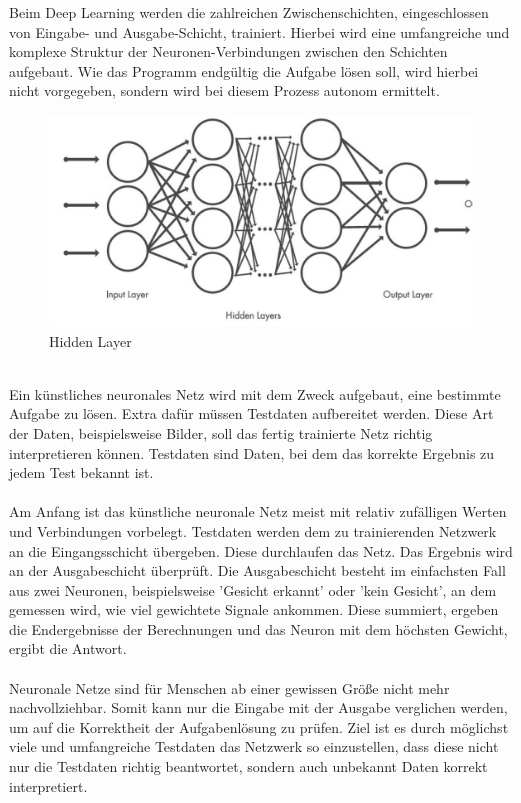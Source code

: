 \documentclass[12pt,oneside,a4paper,parskip]{scrbook}
\begin{document}
Beim Deep Learning werden die zahlreichen Zwischenschichten, eingeschlossen von Eingabe- und Ausgabe-Schicht, trainiert. Hierbei wird eine umfangreiche und komplexe Struktur der Neuronen-Verbindungen zwischen den Schichten aufgebaut. Wie das Programm endgültig die Aufgabe lösen soll, wird hierbei nicht vorgegeben, sondern wird bei diesem Prozess autonom ermittelt.
\begin{figure}[h]
	\begin{center}
		\includegraphics[width=15cm]{Bilder/Deep-Learning.jpg}
		\caption{Hidden Layer}
		\label{fig:DL}
	\end{center}
\end{figure}
\\Ein künstliches neuronales Netz wird mit dem Zweck aufgebaut, eine bestimmte Aufgabe zu lösen. Extra dafür müssen Testdaten aufbereitet werden. Diese Art der Daten, beispielsweise Bilder, soll das fertig trainierte Netz richtig interpretieren können. Testdaten sind Daten, bei dem das korrekte Ergebnis zu jedem Test bekannt ist.
\\\\
Am Anfang ist das künstliche neuronale Netz meist mit relativ zufälligen Werten und Verbindungen vorbelegt. Testdaten werden dem zu trainierenden Netzwerk an die Eingangsschicht übergeben. Diese durchlaufen das Netz. Das Ergebnis wird an der Ausgabeschicht überprüft. Die Ausgabeschicht besteht im einfachsten Fall aus zwei Neuronen, beispielsweise 'Gesicht erkannt' oder 'kein Gesicht', an dem gemessen wird, wie viel gewichtete Signale ankommen. Diese summiert, ergeben die Endergebnisse der Berechnungen und das Neuron mit dem höchsten Gewicht, ergibt die Antwort.
\\\\
Neuronale Netze sind für Menschen ab einer gewissen Größe nicht mehr nachvollziehbar. Somit kann nur die Eingabe mit der Ausgabe verglichen werden, um auf die Korrektheit der Aufgabenlösung zu prüfen. Ziel ist es durch möglichst viele und umfangreiche Testdaten das Netzwerk so einzustellen, dass diese nicht nur die Testdaten richtig beantwortet, sondern auch unbekannt Daten korrekt interpretiert.
\end{document}
